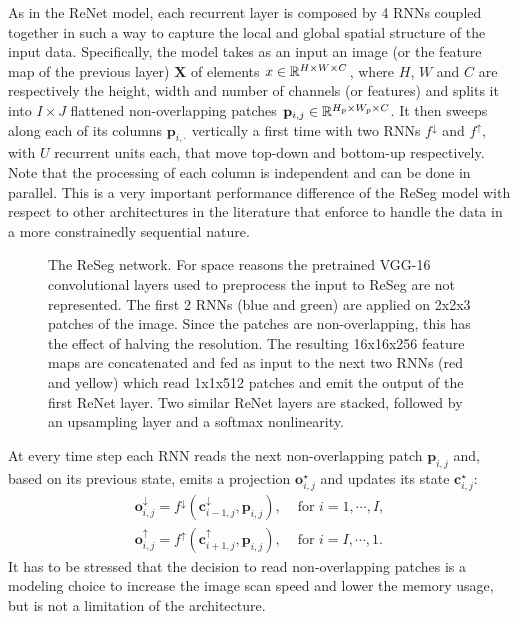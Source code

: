 As in the ReNet model, each recurrent layer is composed by 4 RNNs coupled
together in such a way to capture the local and global spatial structure of the
input data. Specifically, the model takes as an input an image (or the feature
map of the previous layer) $\mathbf{X}$ of elements $x \in \mathbb{R}^{H \times W
\times C}$, where $H$, $W$ and $C$ are respectively the height, width and
number of channels (or features) and splits it into $I \times J$ flattened
non-overlapping patches $\mathbf{p}_{i,j} \in \mathbb{R}^{H_p \times W_p \times C}$.
It then sweeps along each of its columns $\mathbf{p}_{i,\cdot}$ vertically a
first time with two RNNs $f^{\downarrow}$ and $f^{\uparrow}$, with $U$
recurrent units each, that move top-down and bottom-up respectively. Note that
the processing of each column is independent and can be done in parallel. This
is a very important performance difference of the ReSeg model with respect to
other architectures in the literature that enforce to handle the data in a more
constrainedly sequential nature.

\begin{figure}[t]
    \advance{}\textwidth
    \centering
    \caption{The ReSeg network. For space reasons the pretrained VGG-16
        convolutional layers used to preprocess the input to ReSeg are
        not represented. The first 2 RNNs (blue and green) are applied on
        2x2x3 patches of the image. Since the patches are non-overlapping,
        this has the effect of halving the resolution. The resulting 16x16x256
        feature maps are concatenated and fed as input to the next two RNNs
        (red and yellow) which read 1x1x512 patches and emit the output of the
        first ReNet layer. Two similar ReNet layers are stacked, followed by an
        upsampling layer and a softmax nonlinearity.}
    \label{fig:ReSeg}
\end{figure}

At every time step each RNN reads the next non-overlapping patch
$\mathbf{p}_{i,j}$ and, based on its previous state, emits a projection
$\mathbf{o}_{i,j}^{\star}$ and updates its state $\mathbf{c}_{i,j}^{\star}$:
\begin{align}
    \mathbf{o}^{\downarrow}_{i,j} =
        f^{\downarrow}(\mathbf{c}^{\downarrow}_{i-1,j},\mathbf{p}_{i,j}),
        &\text{ for }i=1,\cdots, I,\\
    \mathbf{o}^{\uparrow}_{i,j} = f^{\uparrow}(\mathbf{c}^{\uparrow}_{i+1,j},
        \mathbf{p}_{i,j}), &\text{ for }i=I,\cdots,1.
\end{align}
It has to be stressed that the decision to read non-overlapping patches is a
modeling choice to increase the image scan speed and lower the memory usage,
but is not a limitation of the architecture.

